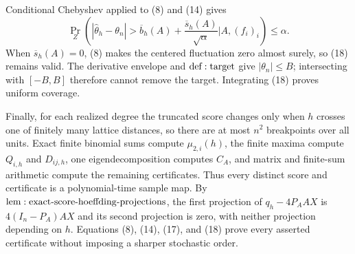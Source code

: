Conditional Chebyshev applied to (8) and (14) gives
\[
 \Pr_Z\!\left(
 |\widehat\theta_h-\theta_n|>
 \overline b_h(A)+\frac{\overline s_h(A)}{\sqrt\alpha}
 \mathrel{\Big|}A,(f_i)_i\right)\leq\alpha.
\tag{18}
\]
When \(\overline s_h(A)=0\), (8) makes the centered fluctuation zero almost surely, so (18) remains valid.  The derivative envelope and \({\rm def:target}\) give \(|\theta_n|\leq B\); intersecting with \([-B,B]\) therefore cannot remove the target.  Integrating (18) proves uniform coverage.

Finally, for each realized degree the truncated score changes only when \(h\) crosses one of finitely many lattice distances, so there are at most \(n^2\) breakpoints over all units.  Exact finite binomial sums compute \(\mu_{2,i}(h)\), the finite maxima compute \(Q_{i,h}\) and \(D_{ij,h}\), one eigendecomposition computes \(C_A\), and matrix and finite-sum arithmetic compute the remaining certificates.  Thus every distinct score and certificate is a polynomial-time sample map.  By \({\rm lem:exact\text{-}score\text{-}hoeffding\text{-}projections}\), the first projection of \(q_h-4P_AAX\) is \(4(I_n-P_A)AX\) and its second projection is zero, with neither projection depending on \(h\).  Equations (8), (14), (17), and (18) prove every asserted certificate without imposing a sharper stochastic order.